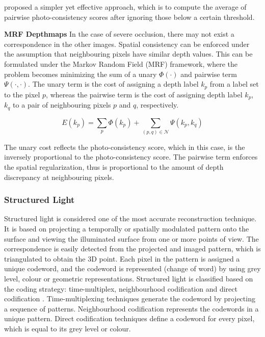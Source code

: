 \citeauthor{goesele2006multi} proposed a simpler yet effective approach, which is to compute the average of pairwise photo-consistency scores after ignoring those below a certain threshold.

\textbf{MRF Depthmaps} In the case of severe occlusion, there may not exist a correspondence in the other images. Spatial consistency can be enforced under the assumption that neighbouring pixels have similar depth values. This can be formulated under the Markov Random Field (MRF) framework, where the problem becomes minimizing the sum of a unary $\Phi(\cdot)$ and pairwise term $\Psi(\cdot, \cdot)$. The unary term is the cost of assigning a depth label $k_p$ from a label set to the pixel $p$, whereas the pairwise term is the cost of assigning depth label $k_p$, $k_q$ to a pair of neighbouring pixels $p$ and $q$, respectively.

\begin{equation}
E(k_p)= \sum_p \Phi(k_p) + \sum_{(p,q)\in\mathcal{N}}\Psi(k_p, k_q)
\end{equation}

The unary cost reflects the photo-consistency score, which in this case, is the inversely proportional to the photo-consistency score. The pairwise term enforces the spatial regularization, thus is proportional to the amount of depth discrepancy at neighbouring pixels. 

\subsubsection{Structured Light}

Structured light is considered one of the most accurate reconstruction technique. It is based on projecting a temporally or spatially modulated pattern onto the surface and viewing the illuminated surface from one or more points of view. The correspondence is easily detected from the projected and imaged pattern, which is triangulated to obtain the 3D point. Each pixel in the pattern is assigned a unique codeword, and the codeword is represented (change of word) by using grey level, colour or geometric representations. Structured light is classified based on the coding strategy: time-multiplex, neighbourhood codification and direct codification \cite{salvi2004pattern}. Time-multiplexing techniques generate the codeword by projecting a sequence of patterns. Neighbourhood codification represents the codewords in a unique pattern. Direct codification techniques define a codeword for every pixel, which is equal to its grey level or colour.

